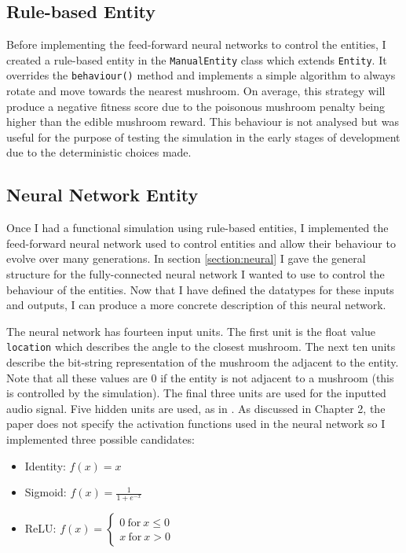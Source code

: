 \documentclass[12pt,a4paper,twoside,openright]{report}
\begin{document}
\subsection{Rule-based Entity}

Before implementing the feed-forward neural networks to control the entities, I created a rule-based entity in the \texttt{ManualEntity} class which extends \texttt{Entity}. It overrides the \texttt{behaviour()} method and implements a simple algorithm to always rotate and move towards the nearest mushroom. On average, this strategy will produce a negative fitness score due to the poisonous mushroom penalty being higher than the edible mushroom reward. This behaviour is not analysed but was useful for the purpose of testing the simulation in the early stages of development due to the deterministic choices made.

\subsection{Neural Network Entity}

Once I had a functional simulation using rule-based entities, I implemented the feed-forward neural network used to control entities and allow their behaviour to evolve over many generations. In section \ref{section:neural} I gave the general structure for the fully-connected neural network I wanted to use to control the behaviour of the entities. Now that I have defined the datatypes for these inputs and outputs, I can produce a more concrete description of this neural network. 

The neural network has fourteen input units. The first unit is the float value \texttt{location} which describes the angle to the closest mushroom. The next ten units describe the bit-string representation of the mushroom the adjacent to the entity. Note that all these values are 0 if the entity is not adjacent to a mushroom (this is controlled by the simulation). The final three units are used for the inputted audio signal. Five hidden units are used, as in \citet{Cangelosi1998}. As discussed in Chapter 2, the paper does not specify the activation functions used in the neural network so I implemented three possible candidates:

\begin{itemize}
	\item Identity: $f(x) = x$
	\item Sigmoid: $f(x) = \frac{1}{1+e^{-x}}$
	\item ReLU: $ f(x) = 
    \left\{
        \begin{array}{ll}
          0~\mathrm{for}~x \leq 0 \\
          x~\mathrm{for}~x > 0
        \end{array}
      \right.
      $
\end{itemize}
\end{document}

